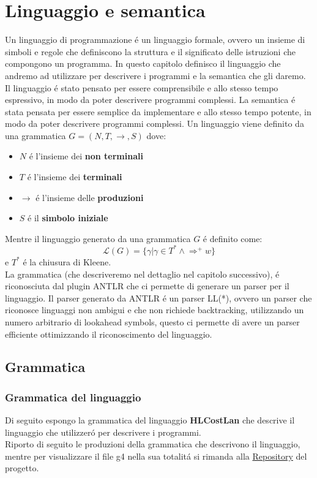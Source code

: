 \documentclass[../../main.tex]{subfiles}
\begin{document}
\chapter{Linguaggio e semantica}
Un linguaggio di programmazione é un linguaggio formale, ovvero un insieme di simboli e regole che definiscono la struttura e il significato delle istruzioni che compongono un programma.
In questo capitolo definisco il linguaggio che andremo ad utilizzare per descrivere i programmi e la semantica che gli daremo. Il linguaggio é stato pensato per essere comprensibile e allo stesso tempo espressivo, in modo da poter descrivere programmi complessi. La semantica é stata pensata per essere semplice da implementare e allo stesso tempo potente, in modo da poter descrivere programmi complessi.
Un linguaggio viene definito da una grammatica $G = (N, T ,\rightarrow, S)$ dove:
\begin{itemize}
    \item $N$ é l'insieme dei \textbf{non terminali}
    \item $T$ é l'insieme dei \textbf{terminali}
    \item $\rightarrow$ é l'insieme delle \textbf{produzioni}
    \item $S$ é il \textbf{simbolo iniziale}
\end{itemize}

Mentre il linguaggio generato da una grammatica $G$ é definito come:
\begin{equation}
    \mathcal{L}(G) = \{\gamma | \gamma \in T^* \land \Rightarrow^+ w\}
\end{equation}
e $T^*$ é la chiusura di Kleene.\\
La grammatica (che descriveremo nel dettaglio nel capitolo successivo), é riconosciuta dal plugin ANTLR che ci permette di generare un parser per il linguaggio. Il parser generato da ANTLR é un parser LL(*), ovvero un parser che riconosce linguaggi non ambigui e che non richiede backtracking, utilizzando un numero arbitrario di lookahead symbols, questo ci permette di avere un parser efficiente ottimizzando il riconoscimento del linguaggio.

\section{Grammatica}

\subsection{Grammatica del linguaggio}
Di seguito espongo la grammatica del linguaggio \textbf{HLCostLan} che descrive il linguaggio che utilizzeró per descrivere i programmi.\\
Riporto di seguito le produzioni della grammatica che descrivono il linguaggio, mentre per visualizzare il file g4 nella sua totalitá si rimanda alla \href{https://github.com/minosse99/CostCompiler/blob/master/src/HLCostLan.g4}{Repository} del progetto.\\
\label{sec:grammatica}
\end{document}
